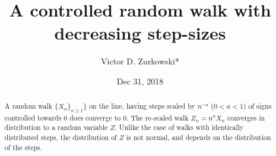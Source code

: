 \documentclass[12pt]{article}
\begin{document}
\title{A controlled random walk with decreasing step-sizes}

\author{Victor D. Zurkowski*}
\date{Dec 31, 2018}

\maketitle

\begin{abstract} 
	A random walk $\{X_n\}_{n \ge 1}\}$ on the line, having steps scaled by $n^{-a}$ ($0 < a <1$) of signs controlled towards $0$ does converge to $0$. The re-scaled walk $Z_n = n^a X_n$ converges in distribution to a random variable $Z$. Unlike the case of walks with identically distributed steps, the distribution of $Z$ is not normal, and depends on the distribution of the steps.  
\end{abstract}


\let\thefootnote\relax{}
\end{document}
